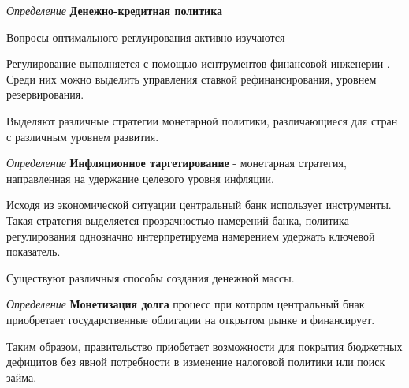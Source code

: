 \textit{Определение} \textbf{Денежно-кредитная политика } 




Вопросы оптимального реглуирования активно изучаются \cite{нэш2008идеальные}

Регулирование выполняется с помощью иснтрументов финансовой инженерии \cite{архипов2007предпосылки}. Среди них можно выделить управления ставкой рефинансирования, уровнем резервирования. 



Выделяют различные стратегии монетарной политики, различающиеся для стран с различным уровнем развития. 

\textit{Определение} \textbf{Инфляционное таргетирование} \cite{bernanke1997inflation} - монетарная стратегия, направленная на удержание целевого уровня инфляции. 

Исходя из экономической ситуации центральный банк использует инструменты. Такая стратегия выделяется прозрачностью намерений банка, политика регулирования однозначно интерпретируема намерением удержать ключевой показатель.



Существуют различныя способы создания денежной массы.

\textit{Определение} \textbf{Монетизация долга} процесс при котором центральный бнак приобретает государственные облигации на открытом рынке и финансирует. 

Таким образом, правительство приобетает возможности для покрытия бюджетных дефицитов без явной потребности в изменение налоговой политики или поиск займа.




